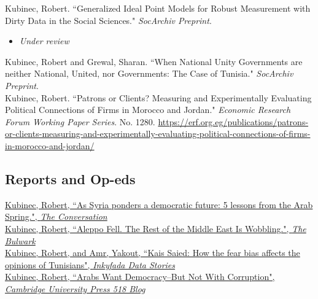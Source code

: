 \documentclass[11pt, a4paper]{article}
\newcommand{\years}[1]{\marginnote{\scriptsize #1}}
\begin{document}
\years{2025} Kubinec, Robert. ``Generalized Ideal Point Models for Robust Measurement with Dirty Data in the Social Sciences." \emph{SocArchiv Preprint}. \\

\begin{itemize}
	\item \emph{Under review}
\end{itemize}

\years{2019} Kubinec, Robert and Grewal, Sharan. ``When National Unity Governments are neither National, United, nor Governments: The Case of Tunisia." \emph{SocArchiv Preprint}. \\

\years{2018} Kubinec, Robert. ``Patrons or Clients? Measuring and Experimentally Evaluating Political Connections of Firms in Morocco and Jordan." \emph{Economic Research Forum Working Paper Series}. No. 1280. \url{https://erf.org.eg/publications/patrons-or-clients-measuring-and-experimentally-evaluating-political-connections-of-firms-in-morocco-and-jordan/}\\

\subsection*{Reports and Op-eds}
\noindent

\years{2025}\href{https://theconversation.com/as-syria-ponders-a-democratic-future-5-lessons-from-the-arab-spring-246203}{Kubinec, Robert, ``As Syria ponders a democratic future: 5 lessons from the Arab Spring.", \emph{The Conversation}}\\

\years{2024}\href{https://www.thebulwark.com/p/aleppo-fell-the-rest-of-the-middle-east-is-wobbling/}{Kubinec, Robert, ``Aleppo Fell. The Rest of the Middle East Is Wobbling.", \emph{The Bulwark}}\\

\years{2023}\href{https://inkyfada.com/en/2023/10/27/kais-saied-fear-bias-opinions-tunisians/}{Kubinec, Robert, and Amr, Yakout, ``Kais Saied: How the fear bias affects the opinions of Tunisians", \emph{Inkyfada Data Stories}}\\

\years{2023}\href{https://www.cambridgeblog.org/2023/07/arabs-want-democracy-but-not-with-corruption/}{Kubinec, Robert, ``Arabs Want Democracy--But Not With Corruption", \emph{Cambridge University Press 518 Blog}}\\
\end{document}

